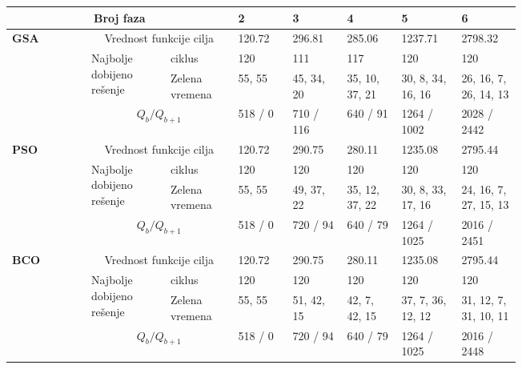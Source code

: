   
  
  \begin{table*}
    \begin{center}
      \begin{tabular}{p{0.12\linewidth}p{0.12\linewidth}p{0.1\linewidth}p{0.08\linewidth}p{0.08\linewidth}p{0.08\linewidth}p{0.08\linewidth}p{0.08\linewidth}}
        \hline 
        \multicolumn{3}{c}{Broj faza} & 2 & 3 & 4 & 5 & 6 \\ 
        \hline 
        \multirow{4}{4em}{\textbf{GSA}} & \multicolumn{2}{c}{Vrednost funkcije cilja}                    
        & 120.72 & 296.81 & 285.06 & 1237.71 & 2798.32 \\
        \cmidrule{2-8}
        & \multirow{2}{0.9\linewidth}{Najbolje dobijeno rešenje} & ciklus 
        & 120 & 111 & 117 & 120 & 120 \\
                               \cmidrule{3-8}
                               &  & Zelena vremena   
        & 55, 55 & 45, 34, 20 & 35, 10, 37, 21 & 30, 8, 34, 16, 16 & 26, 16, 7, 26, 14, 13 \\
        \cmidrule{2-8}
        & \multicolumn{2}{c}{$ Q_b / Q_{b+1}$} 
        & 518 / 0 & 710 / 116 & 640 / 91 & 1264 / 1002 & 2028 / 2442  \\
        
        \hline
        \multirow{4}{4em}{\textbf{PSO}} & \multicolumn{2}{c}{Vrednost funkcije cilja}                    
        & 120.72 & 290.75 & 280.11 & 1235.08 & 2795.44 \\
        \cmidrule{2-8}
        & \multirow{2}{0.9\linewidth}{Najbolje dobijeno rešenje} & ciklus 
        & 120 & 120 & 120 & 120 & 120 \\ 
                               \cmidrule{3-8}
                               &  & Zelena vremena   
        & 55, 55 & 49, 37, 22 & 35, 12, 37, 22 & 30, 8, 33, 17, 16 & 24, 16, 7, 27, 15, 13 \\
        \cmidrule{2-8}
        & \multicolumn{2}{c}{$ Q_b / Q_{b+1}$} 
        & 518 / 0 & 720 / 94 & 640 / 79  & 1264 / 1025 &  2016 / 2451 \\
        \hline
        \multirow{4}{4em}{\textbf{BCO}} & \multicolumn{2}{c}{Vrednost funkcije cilja}                     
        & 120.72 & 290.75 & 280.11 & 1235.08 & 2795.44  \\
        \cmidrule{2-8}
        & \multirow{2}{0.9\linewidth}{Najbolje dobijeno rešenje} & ciklus 
        & 120 & 120 & 120 & 120 & 120 \\ 
                               \cmidrule{3-8}
                               &  & Zelena vremena   
        &  55, 55 & 51, 42, 15 & 42, 7, 42, 15 & 37, 7, 36, 12, 12 & 31, 12, 7, 31, 10, 11  \\
        \cmidrule{2-8}
        & \multicolumn{2}{c}{$ Q_b / Q_{b+1}$} 
        & 518 / 0 & 720 / 94 & 640 / 79  & 1264 / 1025 &  2016 / 2448 \\
        \hline
      \end{tabular}
    \end{center}
  \end{table*}
  
